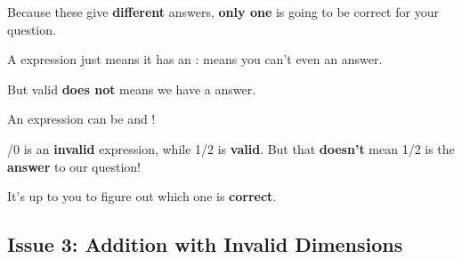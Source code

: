         Because these give \textbf{different} answers, \textbf{only one} is going to be correct for your question.\\
        
        \begin{clarification}
            A  expression just means it has an :  means you can't even  an answer.
            
            But valid \textbf{does not} means we have a  answer.
            
            An expression can be  and !
        \end{clarification}
        
        /0 is an \textbf{invalid} expression, while 1/2 is \textbf{valid}. But that \textbf{doesn't} mean 1/2 is the \textbf{answer} to our question!
        
        It's up to you to figure out which one is \textbf{correct}.
        
        
    \subsection*{Issue 3: Addition with Invalid Dimensions}
        
